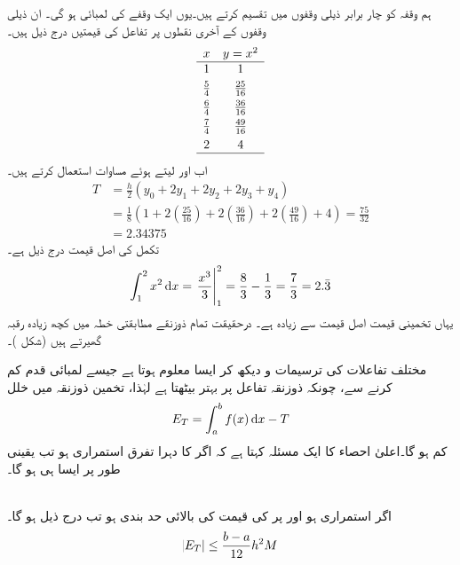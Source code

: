 ہم وقفہ  کو چار برابر ذیلی وقفوں میں تقسیم کرتے ہیں۔یوں ایک وقفے  کی لمبائی  ہو گی۔ ان ذیلی وقفوں کے آخری نقطوں پر تفاعل  کی قیمتیں درج ذیل ہیں۔
\begin{align*}
\begin{array}{cc}
x&y=x^2\\
\hline
1&1\\[0.75ex]
\frac{5}{4}&\frac{25}{16}\\[0.75ex]
\frac{6}{4}&\frac{36}{16}\\[0.75ex]
\frac{7}{4}&\frac{49}{16}\\[0.75ex]
2&4\\
\hline
\end{array}
\end{align*}
 اب  اور  لیتے ہوئے مساوات  استعمال کرتے ہیں۔
\begin{align*}
T&=\frac{h}{2}(y_0+2y_1+2y_2+2y_3+y_4)\\
&=\frac{1}{8}(1+2(\tfrac{25}{16})+2(\tfrac{36}{16})+2(\tfrac{49}{16})+4)=\frac{75}{32}\\
&=\num{2.34375}
\end{align*} 
تکمل کی اصل قیمت درج ذیل ہے۔
\begin{align*}
\int_1^2x^2\dif x=\left.\frac{x^3}{3}\right\vert_1^2=\frac{8}{3}-\frac{1}{3}=\frac{7}{3}=2.\bar{3}
\end{align*}
یہاں تخمینی قیمت اصل قیمت سے زیادہ ہے۔ درحقیقت تمام ذوزنقے مطابقتی خطہ میں کچھ زیادہ رقبہ گھیرتے ہیں (شکل )۔

مختلف تفاعلات  کی ترسیمات و دیکھ کر ایسا معلوم ہوتا ہے  جیسے لمبائی قدم  کم کرنے سے، چونکہ ذوزنقہ تفاعل پر بہتر بیٹھتا ہے لہٰذا،    تخمین  ذوزنقہ میں خلل
\begin{align}\label{مساوات_تکمل_خلل_ذوزنقہ_تعریف}
E_T=\int_a^bf(x)\dif x-T
\end{align}
 کم ہو گا۔اعلیٰ احصاء کا ایک مسئلہ کہتا ہے کہ اگر  کا دہرا تفرق استمراری ہو تب یقینی طور پر ایسا ہی ہو گا۔

\\
اگر  استمراری ہو اور  پر  کی قیمت کی بالائی حد بندی   ہو تب درج ذیل ہو گا۔
\begin{align}\label{مساوات_تکمل_ذوزنقہ_قاعدہ_خلل_مطلق}
\abs{E_T}\le \frac{b-a}{12}h^2M
\end{align} 

